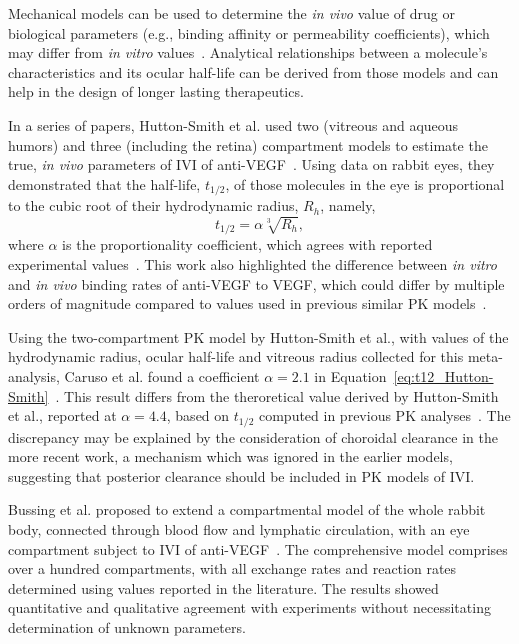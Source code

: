 \documentclass{article}
\begin{document}
Mechanical models can be used to determine the \textit{in vivo} value of drug or biological parameters (e.g., binding affinity or permeability coefficients), which may differ from \textit{in vitro} values~\cite{HuttonSmith_2016}.
Analytical relationships between a molecule's characteristics and its ocular half-life can be derived from those models and can help in the design of longer lasting therapeutics.

In a series of papers, Hutton-Smith et al. used two (vitreous and aqueous humors) and three (including the retina) compartment models to estimate the true, \textit{in vivo} parameters of IVI of anti-VEGF~\cite{HuttonSmith_2016,HuttonSmith_2017,HuttonSmith_2018}.
Using data on rabbit eyes, they demonstrated that the half-life, $t_{1/2}$, of those molecules in the eye is proportional to the cubic root of their hydrodynamic radius, $R_h$, namely,
\begin{equation}
  \label{eq:t12_Hutton-Smith}
  t_{1/2} = \alpha\sqrt[3]{R_h},
\end{equation}
where $\alpha$ is the proportionality coefficient, which agrees with reported experimental values~\cite{HuttonSmith_2016}.
This work also highlighted the difference between \textit{in vitro} and \textit{in vivo} binding rates of anti-VEGF to VEGF, which could differ by multiple orders of magnitude compared to values used in previous similar PK models~\cite{Saunders_2015}.

Using the two-compartment PK model by Hutton-Smith et al., with values of the hydrodynamic radius, ocular half-life and vitreous radius collected for this meta-analysis, Caruso et al. found a coefficient $\alpha=2.1$ in Equation~\ref{eq:t12_Hutton-Smith}~\cite{Caruso_2020}.
This result differs from the theroretical value derived by Hutton-Smith et al., reported at $\alpha=4.4$, based on $t_{1/2}$ computed in previous PK analyses~\cite{HuttonSmith_2016}.
The discrepancy may be explained by the consideration of choroidal clearance in the more recent work, a mechanism which was ignored in the earlier models, suggesting that posterior clearance should be included in PK models of IVI.


Bussing et al. proposed to extend a compartmental model of the whole rabbit body, connected through blood flow and lymphatic circulation, with an eye compartment subject to IVI of anti-VEGF~\cite{Bussing_2020}.
The comprehensive model comprises over a hundred compartments, with all exchange rates and reaction rates determined using values reported in the literature.
The results showed quantitative and qualitative agreement with experiments without necessitating determination of unknown parameters. 
\end{document}
